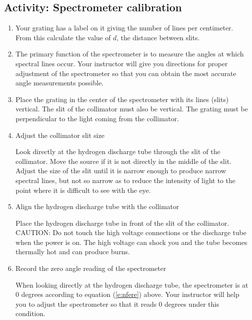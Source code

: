 \subsection{Activity: Spectrometer calibration}
\begin{enumerate}
	 \item 	Your grating has a label on it giving the number of lines per centimeter.  From this calculate the value of $d$, the distance between slits.
	 \item 	The primary function of the spectrometer is to measure the angles at which spectral lines occur.  Your instructor will give you directions for proper adjustment of the spectrometer so that you can obtain the most accurate angle measurements possible.
	 \item 	Place the grating in the center of the spectrometer with its lines (slits) vertical.  The slit of the collimator must also be vertical.  The grating must be perpendicular to the light coming from the collimator.
	\item Adjust the collimator slit size
	
	Look directly at the hydrogen discharge tube through the slit of the collimator.  Move the source if it is not directly in the middle of the slit.  Adjust the size of the slit until it is narrow enough to produce narrow spectral lines, but not so narrow as to reduce the intensity of light to the point where it is difficult to see with the eye.
	\item Align the hydrogen discharge tube with the collimator
	
	Place the hydrogen discharge tube in front of the slit of the collimator.  CAUTION:  Do not touch the high voltage connections or the discharge tube when the power is on.  The high voltage can shock you and the tube becomes thermally hot and can produce burns.
	
	\item Record the zero angle reading of the spectrometer
	
	When looking directly at the hydrogen discharge tube, the spectrometer is at 0 degrees according to equation (\ref{e:nfere}) above.  Your instructor will help you to adjust the spectrometer so that it reads 0 degrees under this condition.
\end{enumerate}

